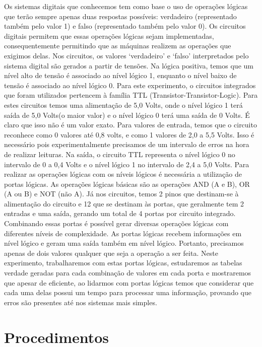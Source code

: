 \documentclass[12pt]{article}
\begin{document}
Os sistemas digitais que conhecemos tem como base o uso de operações lógicas que terão sempre apenas duas respostas possíveis: verdadeiro (representado também pelo valor 1) e falso (representado também pelo valor 0). Os circuitos digitais permitem que essas operações lógicas sejam implementadas, consequentemente permitindo que as máquinas realizem as operações que exigimos delas. 
Nos circuitos, os valores ‘verdadeiro’ e ‘falso’ interpretados pelo sistema digital são gerados a partir de tensões. Na lógica positiva, temos que um nível alto de tensão é associado ao nível lógico 1, enquanto o nível baixo de tensão é associado ao nível lógico 0.
Para este experimento, o circuitos integrados que foram utilizados pertencem à família TTL (Transistor-Transistor-Logic). Para estes circuitos temos uma alimentação de 5,0 Volts, onde o nível lógico 1 terá saída de 5,0 Volts(o maior valor) e o nível lógico 0 terá uma saída de 0 Volts. É claro que isso não é um valor exato. Para valores de entrada, temos que o circuito reconhece como 0 valores até 0,8 volts, e como 1 valores de 2,0 a 5,5 Volts. Isso é necessário pois experimentalmente precisamos de um intervalo de erros na hora de realizar leituras. Na saída, o circuito TTL representa o nível lógico 0 no intervalo de 0 a 0,4 Volts e o nível lógico 1 no intervalo de 2,4 a 5,0 Volts.
Para realizar as operações lógicas com os níveis lógicos é necessária a utilização de portas lógicas. As operações lógicas básicas são as operações AND (A e B), OR (A ou B) e NOT (não A). Já nos circuitos, temos 2 pinos que destinam-se à alimentação do circuito e 12 que se destinam às portas, que geralmente tem 2 entradas e uma saída, gerando um total de 4 portas por circuito integrado. Combinando essas portas é possível gerar diversas operações lógicas com diferentes níveis de complexidade. As portas lógicas recebem informações em nível lógico e geram uma saída também em nível lógico. Portanto, precisamos apenas de dois valores qualquer que seja a operação a ser feita.
Neste experimento, trabalharemos com estas portas lógicas, estudaremos as tabelas verdade geradas para cada combinação de valores em cada porta e mostraremos que apesar de eficiente, ao lidarmos com portas lógicas temos que considerar que cada uma delas possui um tempo para processar uma informação, provando que erros são presentes até nos sistemas mais simples.


\section{Procedimentos}
\label{sec:Procedimentos}
\end{document}
